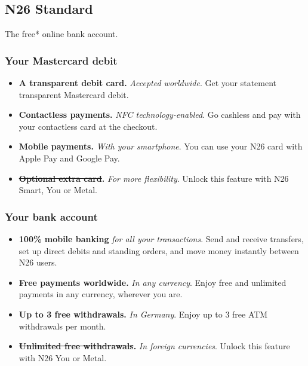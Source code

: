 \documentclass[onsided]{book}
\numberwithin{equation}{section}
\begin{document}
\subsection{N26 Standard}
The free* online bank account.

\subsubsection{Your Mastercard debit}
\begin{itemize}
    \item \textbf{A transparent debit card.} \textit{Accepted worldwide}. Get your statement transparent Mastercard debit.
    \item \textbf{Contactless payments.} \textit{NFC technology-enabled}. Go cashless and pay with your contactless card at the checkout.
    \item \textbf{Mobile payments.} \textit{With your smartphone}. You can use your N26 card with Apple Pay and Google Pay.
    \item \textbf{\st{Optional extra card}.} \textit{For more flexibility}. Unlock this feature with N26 Smart, You or Metal.
\end{itemize}

\subsubsection{Your bank account}
\begin{itemize}
    \item \textbf{100\% mobile banking} \textit{for all your transactions}. Send and receive transfers, set up direct debits and standing orders, and move money instantly between N26 users.
    \item \textbf{Free payments worldwide.} \textit{In any currency}. Enjoy free and unlimited payments in any currency, wherever you are.
    \item \textbf{Up to 3 free withdrawals.} \textit{In Germany}. Enjoy up to 3 free ATM withdrawals per month.
    \item \textbf{\st{Unlimited free withdrawals}.} \textit{In foreign currencies}. Unlock this feature with N26 You or Metal.
\end{itemize}
\end{document}
